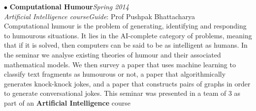 \documentclass[a4paper,9pt]{article}
\begin{document}
$\bullet$ \textbf{Computational Humour}\hfill\textit{Spring 2014}\\
\textcolor{mydarkgray}{\textit{Artificial Intelligence course}}\hfill\textit{Guide}: \textcolor{mydarkgray}{Prof Pushpak Bhattacharya}\\
Computational humour is the problem of generating, identifying  and responding to humourous situations. It lies in the AI-complete category of problems, meaning that if it is solved, then computers can be said to be as intelligent as humans. In the seminar we analyse existing theories of humour and their associated mathematical models. We then survey a paper that uses machine learning to classify text fragments as humourous or not, a paper that algorithmically generates knock-knock jokes, and a paper that constructs pairs of graphs in order to generate conversational jokes. This seminar was presented in a team of 3 as part of an \textbf{Artificial Intelligence} course\\\\
\end{document}
